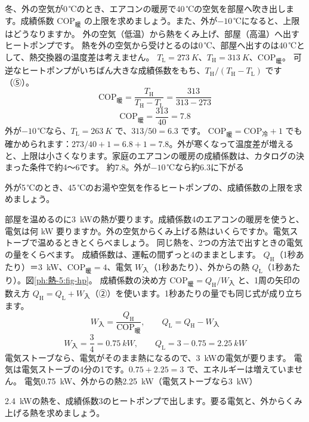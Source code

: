 \label{ph:熱-5:ex4}
\begin{phreidai}[暖房のヒートポンプの上限]
冬、外の空気が0\,℃のとき、エアコンの暖房で40\,℃の空気を部屋へ吹き出します。成績係数 $\mathrm{COP}_{\text{暖}}$ の上限を求めましょう。また、外が$-10$\,℃になると、上限はどうなりますか。
\phbamen
外の空気（低温）から熱をくみ上げ、部屋（高温）へ出すヒートポンプです。
\phmushi
熱を外の空気から受けとるのは0\,℃、部屋へ出すのは40\,℃として、熱交換器の温度差は考えません。
\phzu
$T_{\mathrm L}=\qty{273}{K}$、$T_{\mathrm H}=\qty{313}{K}$、$\mathrm{COP}_{\text{暖}}$。
\phriyu
可逆なヒートポンプがいちばん大きな成績係数をもち、$T_{\mathrm H}/(T_{\mathrm H}-T_{\mathrm L})$ です（⑤）。
\phtateru
\[\mathrm{COP}_{\text{暖}}=\frac{T_{\mathrm H}}{T_{\mathrm H}-T_{\mathrm L}}=\frac{313}{313-273}\]
\phtoku
\[\mathrm{COP}_{\text{暖}}=\frac{313}{40}=7.8\]
外が$-10$\,℃なら、$T_{\mathrm L}=\qty{263}{K}$ で、$313/50=6.3$ です。
\phtashikame
$\mathrm{COP}_{\text{暖}}=\mathrm{COP}_{\text{冷}}+1$ でも確かめられます：$273/40+1=6.8+1=7.8$。外が寒くなって温度差が増えると、上限は小さくなります。家庭のエアコンの暖房の成績係数は、カタログの決まった条件で約4〜6です。
\kotae 約7.8。外が$-10$\,℃なら約6.3に下がる
\end{phreidai}
\begin{jibun}
外が5\,℃のとき、45\,℃のお湯や空気を作るヒートポンプの、成績係数の上限を求めましょう。
\end{jibun}

\label{ph:熱-5:ex5}
\begin{phreidai}[ヒートポンプと電気ストーブ]
部屋を温めるのに\qty{3}{kW}の熱が要ります。成績係数4のエアコンの暖房を使うと、電気は何 kW 要りますか。外の空気からくみ上げる熱はいくらですか。電気ストーブで温めるときとくらべましょう。
\phbamen
同じ熱を、2つの方法で出すときの電気の量をくらべます。
\phmushi
成績係数は、運転の間ずっと4のままとします。
\phzu
$Q_{\mathrm H}$（1秒あたり）＝\qty{3}{kW}、$\mathrm{COP}_{\text{暖}}=4$、電気 $W_{\text{入}}$（1秒あたり）、外からの熱 $Q_{\mathrm L}$（1秒あたり）。図\ref{ph:熱-5:fig-hp}。
\phriyu
成績係数の決め方 $\mathrm{COP}_{\text{暖}}=Q_{\mathrm H}/W_{\text{入}}$ と、1周の矢印の数え方 $Q_{\mathrm H}=Q_{\mathrm L}+W_{\text{入}}$（②）を使います。1秒あたりの量でも同じ式が成り立ちます。
\phtateru
\[W_{\text{入}}=\frac{Q_{\mathrm H}}{\mathrm{COP}_{\text{暖}}},\qquad Q_{\mathrm L}=Q_{\mathrm H}-W_{\text{入}}\]
\phtoku
\[W_{\text{入}}=\frac{3}{4}=\qty{0.75}{kW},\qquad Q_{\mathrm L}=3-0.75=\qty{2.25}{kW}\]
電気ストーブなら、電気がそのまま熱になるので、\qty{3}{kW}の電気が要ります。
\phtashikame
電気は電気ストーブの4分の1です。$0.75+2.25=3$ で、エネルギーは増えていません。
\kotae 電気\qty{0.75}{kW}、外からの熱\qty{2.25}{kW}（電気ストーブなら\qty{3}{kW}）
\end{phreidai}
\begin{jibun}
\qty{2.4}{kW}の熱を、成績係数3のヒートポンプで出します。要る電気と、外からくみ上げる熱を求めましょう。
\end{jibun}

